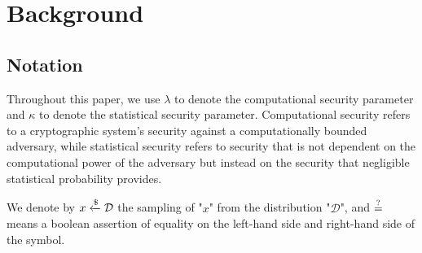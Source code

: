 \section{Background}
\label{sec:background}

\subsection{Notation}
Throughout this paper, we use $\lambda$ to denote the computational security parameter and $\kappa$ to denote the statistical security parameter. Computational security refers to a cryptographic system's security against a computationally bounded adversary, while statistical security refers to security that is not dependent on the computational power of the adversary but instead on the security that negligible statistical probability provides.

We denote by $x \xleftarrow{\$} \mathcal D$ the sampling of "$x$" from the distribution "$\mathcal D$", and $\overset {?} {=}$ means a boolean assertion of equality on the left-hand side and right-hand side of the symbol.













